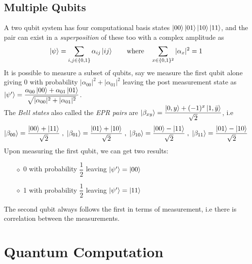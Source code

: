 \subsection{Multiple Qubits}
A two qubit system has four computational basis states $\ket{00}\ket{01}\ket{10}\ket{11}$, and the pair can exist in a \textit{superposition} of these too with a complex amplitude as 
\begin{equation}\ket{\psi} = \sum_{i,j \in \{0,1\}} \alpha_{ij}\ket{ij} \qquad\text{where} \quad \sum_{x\in\{0,1\}^2}|\alpha_x|^2 = 1 \end{equation}
It is possible to measure a subset of qubits, say we measure the first qubit alone giving 0 with probability $|\alpha_{00}|^2 + |\alpha_{01}|^2$ leaving the post measurement state as $\ket{\psi'} = \dfrac{\alpha_{00}\ket{00} + \alpha_{01}\ket{01}}{\sqrt{|\alpha_{00}|^2 + |\alpha_{01}|^2}}$. \\
The \textit{Bell states} also called the \textit{EPR pairs} are $\ket{\beta_{xy}} = \dfrac{\ket{0,y} + (-1)^x \ket{1, \bar{y}}}{\sqrt 2}$, i.e
\begin{equation}\label{eq-bell}
    \ket{\beta_{00}} = \dfrac{\ket{00} + \ket{11}}{\sqrt 2}\;,\; \ket{\beta_{01}} = \dfrac{\ket{01} + \ket{10}}{\sqrt 2} \;,\;\ket{\beta_{10}} = \dfrac{\ket{00} - \ket{11}}{\sqrt 2}
    \;,\; \ket{\beta_{11}} = \dfrac{\ket{01} - \ket{10}}{\sqrt 2}
\end{equation}
Upon measuring the first qubit, we can get two results: 
\begin{itemize}
    \item[$\diamond$] 0 with probability $\dfrac{1}{2}$ leaving $\ket{\psi'} = \ket{00}$
    \item[$\diamond$] 1 with probability $\dfrac{1}{2}$ leaving $\ket{\psi'} = \ket{11}$
\end{itemize}
The second qubit always follows the first in terms of measurement, i.e there is correlation between the measurements.
\section{Quantum Computation}
